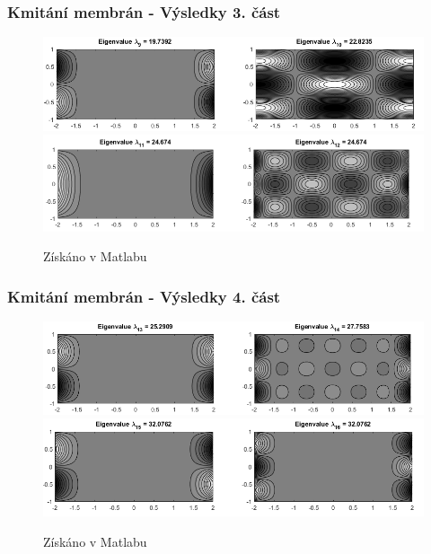 \documentclass[xcolor=table]{beamer}
\begin{document}
\begin{frame}
\frametitle{Kmitání membrán - Výsledky 3. část}
\centering
\begin{figure}
\includegraphics[width=1\linewidth]{obdelnicky5.png}
\includegraphics[width=1\linewidth]{obdelnicky6.png}
\caption{Získáno v Matlabu}
\end{figure}
\end{frame}

\begin{frame}
\frametitle{Kmitání membrán - Výsledky 4. část}
\centering
\begin{figure}
\includegraphics[width=1\linewidth]{obdelnicky7.png}
\includegraphics[width=1\linewidth]{obdelnicky8.png}
\caption{Získáno v Matlabu}
\end{figure}
\end{frame}
\end{document}

